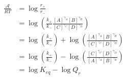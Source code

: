 \begin{eqnarray}\label{eqn:reaction-affinity-masss}
\frac{\mathcal A}{RT} &= \log\frac{r_+}{r_-} \\
& = \log\left(\frac{k_+}{k_-}\frac{[A]^{\gamma_A}[B]^{\gamma_B}}{[C]^{\gamma_C}[D]^{\gamma_D}}\right) \\
& = \log\left(\frac{k_+}{k_-}\right) + \log\left(\frac{[A]^{\gamma_A}[B]^{\gamma_B}}{[C]^{\gamma_C}[D]^{\gamma_D}}\right) \\
& = \log\left(\frac{k_+}{k_-}\right) - \log\left(\frac{[C]^{\gamma_C}[D]^{\gamma_D}}{[A]^{\gamma_A}[B]^{\gamma_B}}\right) \\
& =\log K_{eq} - \log{Q_r} \\
\end{eqnarray}